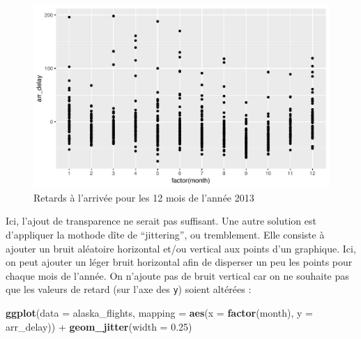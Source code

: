 \documentclass[a4paperpaper,]{article}
\newenvironment{Shaded}{\begin{snugshade}}{\end{snugshade}}
\newcommand{\DataTypeTok}[1]{\textcolor[rgb]{0.00,0.34,0.68}{#1}}
\newcommand{\FloatTok}[1]{\textcolor[rgb]{0.69,0.50,0.00}{#1}}
\newcommand{\KeywordTok}[1]{\textcolor[rgb]{0.12,0.11,0.11}{\textbf{#1}}}
\newcommand{\NormalTok}[1]{\textcolor[rgb]{0.12,0.11,0.11}{#1}}
\newcommand{\OperatorTok}[1]{\textcolor[rgb]{0.12,0.11,0.11}{#1}}
\newcommand{\StringTok}[1]{\textcolor[rgb]{0.75,0.01,0.01}{#1}}
\theoremstyle{definition}
\theoremstyle{definition}
\theoremstyle{definition}
\theoremstyle{remark}
\begin{document}
\begin{figure}[htpb]

{\centering \includegraphics[width=0.9\linewidth]{figure/unnamed-chunk-41-1} 

}

\caption{Retards à l'arrivée pour les 12 mois de l'année 2013}\label{fig:unnamed-chunk-41}
\end{figure}

Ici, l'ajout de transparence ne serait pas suffisant. Une autre solution
est d'appliquer la mothode dîte de ``jittering'', ou tremblement. Elle
consiste à ajouter un bruit aléatoire horizontal et/ou vertical aux
points d'un graphique. Ici, on peut ajouter un léger bruit horizontal
afin de disperser un peu les points pour chaque mois de l'année. On
n'ajoute pas de bruit vertical car on ne souhaite pas que les valeurs de
retard (sur l'axe des \texttt{y}) soient altérées :

\begin{Shaded}
\begin{Highlighting}[]
\KeywordTok{ggplot}\NormalTok{(}\DataTypeTok{data =}\NormalTok{ alaska_flights, }\DataTypeTok{mapping =} \KeywordTok{aes}\NormalTok{(}\DataTypeTok{x =} \KeywordTok{factor}\NormalTok{(month), }\DataTypeTok{y =}\NormalTok{ arr_delay)) }\OperatorTok{+}
\StringTok{  }\KeywordTok{geom_jitter}\NormalTok{(}\DataTypeTok{width =} \FloatTok{0.25}\NormalTok{)}
\end{Highlighting}
\end{Shaded}
\end{document}
